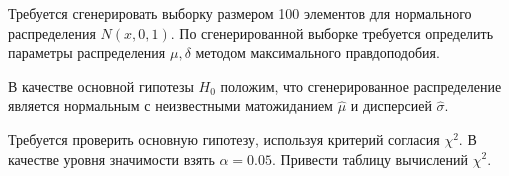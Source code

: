 Требуется сгенерировать выборку размером 100 элементов для нормального распределения $N(x, 0, 1)$. По сгенерированной выборке требуется определить параметры распределения $\mu, \delta$ методом максимального правдоподобия.

В качестве основной гипотезы $H_0$ положим, что сгенерированное распределение является нормальным с неизвестными матожиданием $\hat{\mu}$ и дисперсией $\hat{\sigma}$.

Требуется проверить основную гипотезу, используя критерий согласия $\chi^2$. В качестве уровня значимости взять $\alpha=0.05$. Привести таблицу вычислений $\chi^2$.